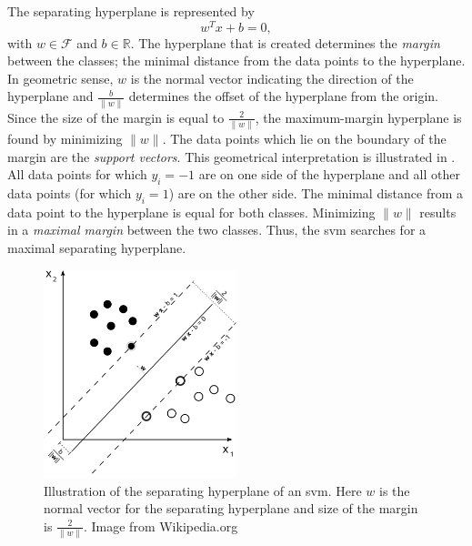 The separating hyperplane is represented by
\begin{equation}
w^T x + b = 0,
\end{equation}
with $w \in \mathcal{F}$ and $b \in \mathbb{R}$.
The hyperplane that is created determines the \emph{margin} between the classes; the minimal distance from the data points to the hyperplane.
In geometric sense, $w$ is the normal vector indicating the direction of the hyperplane and $\frac{b}{\lVert{w}\rVert}$ determines the offset of the hyperplane from the origin.
Since the size of the margin is equal to $\frac{2}{\lVert{w}\rVert}$, the maximum-margin hyperplane is found by minimizing $\lVert{w}\rVert$.
The data points which lie on the boundary of the margin are the \emph{support vectors}.
This geometrical interpretation is illustrated in .
All data points for which $y_i = -1$ are on one side of the hyperplane and all other data points (for which $y_i = 1$) are on the other side.
The minimal distance from a data point to the hyperplane is equal for both classes.
Minimizing $\lVert{w}\rVert$ results in a \emph{maximal margin} between the two classes.
Thus, the \gls{svm} searches for a maximal separating hyperplane.

\begin{figure}
\centering
  \includegraphics[width=0.5\textwidth]{./Figures/chapter3/svm_separating_plane_with_margin.png}
  \caption[Support Vector Machines and the separating hyperplane]{Illustration of the separating hyperplane of an \gls{svm}.
  Here $w$ is the normal vector for the separating hyperplane and size of the margin is $\frac{2}{\lVert{w}\rVert}$.
  Image from Wikipedia.org}
  \label{fig:svm_hyperplane}
\end{figure}

